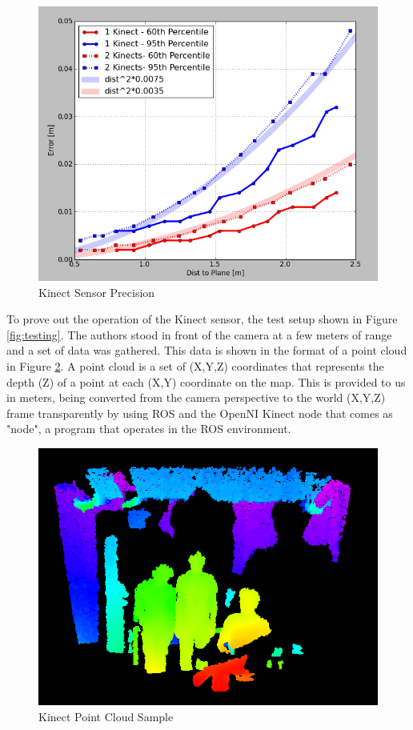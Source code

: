 \documentclass[oneside,final,a4paper]{report}
\begin{document}
\begin{figure}[hbt]
 \centering
 \includegraphics[scale=0.35]{kinect_precision}
 \caption{Kinect Sensor Precision \cite{kinect_prec}} \label{fig:kinect_precision}
\end{figure}

To prove out the operation of the Kinect sensor, the test setup shown in Figure \ref{fig:testing}. The authors stood in front of the camera at a few meters of range and a set of data was gathered. This data is shown in the format of a point cloud \cite{point_clouds} in Figure \ref{fig:groupPCL}. A point cloud is a set of (X,Y,Z) coordinates that represents the depth (Z) of a point at each (X,Y) coordinate on the map. This is provided to us in meters, being converted from the camera perspective to the world (X,Y,Z) frame transparently by using ROS and the OpenNI Kinect node that comes as  "node", a program that operates in the ROS environment.

\begin{figure}[hbt]
 \centering
 \includegraphics[scale=0.35]{group_pointcloud}
 \caption{Kinect Point Cloud Sample} \label{fig:groupPCL}
\end{figure}
\end{document}
